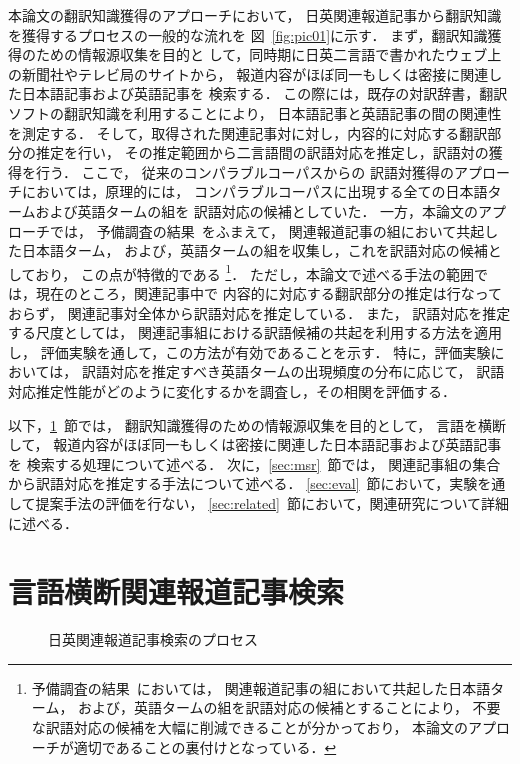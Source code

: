 本論文の翻訳知識獲得のアプローチにおいて，
日英関連報道記事から翻訳知識を獲得するプロセスの一般的な流れを
図~\ref{fig:pic01}に示す．
まず，翻訳知識獲得のための情報源収集を目的と
して，同時期に日英二言語で書かれたウェブ上の新聞社やテレビ局のサイトから，
報道内容がほぼ同一もしくは密接に関連した日本語記事および英語記事を
検索する．
この際には，既存の対訳辞書，翻訳ソフトの翻訳知識を利用することにより，
日本語記事と英語記事の間の関連性を測定する．
そして，取得された関連記事対に対し，内容的に対応する翻訳部分の推定を行い，
その推定範囲から二言語間の訳語対応を推定し，訳語対の獲得を行う．
ここで，  
  従来のコンパラブルコーパスからの
  訳語対獲得のアプローチにおいては，原理的には，
  コンパラブルコーパスに出現する全ての日本語タームおよび英語タームの組を
  訳語対応の候補としていた．
  一方，本論文のアプローチでは，
  予備調査の結果~\cite{Utsuro03b,Horiuchi03aj}をふまえて，
  関連報道記事の組において共起した日本語ターム，
  および，英語タームの組を収集し，これを訳語対応の候補としており，
  この点が特徴的である
  \footnote{
  予備調査の結果~\cite{Utsuro03b,Horiuchi03aj}においては，
  関連報道記事の組において共起した日本語ターム，
  および，英語タームの組を訳語対応の候補とすることにより，
  不要な訳語対応の候補を大幅に削減できることが分かっており，
  本論文のアプローチが適切であることの裏付けとなっている．
}．
ただし，本論文で述べる手法の範囲では，現在のところ，関連記事中で
内容的に対応する翻訳部分の推定は行なっておらず，
関連記事対全体から訳語対応を推定している．
また，
訳語対応を推定する尺度としては，
関連記事組における訳語候補の共起を利用する方法を適用し，
評価実験を通して，この方法が有効であることを示す．
特に，評価実験においては，
訳語対応を推定すべき英語タームの出現頻度の分布に応じて，
訳語対応推定性能がどのように変化するかを調査し，その相関を評価する．


以下，\ref{sec:clir}~節では，
翻訳知識獲得のための情報源収集を目的として，
言語を横断して，
報道内容がほぼ同一もしくは密接に関連した日本語記事および英語記事を
検索する処理について述べる．
次に，\ref{sec:msr}~節では，
関連記事組の集合から訳語対応を推定する手法について述べる．
\ref{sec:eval}~節において，実験を通して提案手法の評価を行ない，
\ref{sec:related}~節において，関連研究について詳細に述べる．


\section{言語横断関連報道記事検索}
\label{sec:clir}

\begin{figure}
\begin{center}


\caption{日英関連報道記事検索のプロセス}
\label{fig:clir}
\end{center}
\end{figure}

